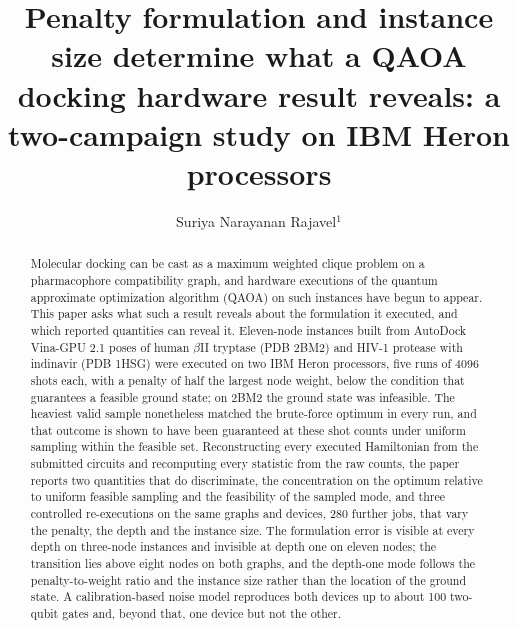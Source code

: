 \documentclass{iopjournal}
\begin{document}

\title{Penalty formulation and instance size determine what a QAOA docking hardware result reveals: a two-campaign study on IBM Heron processors}

\author{Suriya Narayanan Rajavel$^{1}$}




\begin{abstract}
Molecular docking can be cast as a maximum weighted clique problem on a pharmacophore compatibility graph, and hardware executions of the quantum approximate optimization algorithm (QAOA) on such instances have begun to appear. This paper asks what such a result reveals about the formulation it executed, and which reported quantities can reveal it. Eleven-node instances built from AutoDock Vina-GPU 2.1 poses of human $\beta$II tryptase (PDB 2BM2) and HIV-1 protease with indinavir (PDB 1HSG) were executed on two IBM Heron processors, five runs of 4096 shots each, with a penalty of half the largest node weight, below the condition that guarantees a feasible ground state; on 2BM2 the ground state was infeasible. The heaviest valid sample nonetheless matched the brute-force optimum in every run, and that outcome is shown to have been guaranteed at these shot counts under uniform sampling within the feasible set. Reconstructing every executed Hamiltonian from the submitted circuits and recomputing every statistic from the raw counts, the paper reports two quantities that do discriminate, the concentration on the optimum relative to uniform feasible sampling and the feasibility of the sampled mode, and three controlled re-executions on the same graphs and devices, 280 further jobs, that vary the penalty, the depth and the instance size. The formulation error is visible at every depth on three-node instances and invisible at depth one on eleven nodes; the transition lies above eight nodes on both graphs, and the depth-one mode follows the penalty-to-weight ratio and the instance size rather than the location of the ground state. A calibration-based noise model reproduces both devices up to about 100 two-qubit gates and, beyond that, one device but not the other.
\end{abstract}
\end{document}

